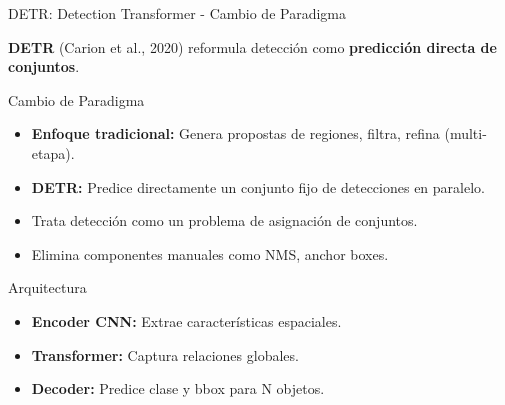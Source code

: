 \documentclass[aspectratio=169, 10pt]{beamer}
\begin{document}
\begin{frame}{DETR: Detection Transformer - Cambio de Paradigma}

	\textbf{DETR} (Carion et al., 2020) reformula detecci\'on como \textbf{predicci\'on directa de conjuntos}.

	\vspace{0.3cm}

	\begin{block}{Cambio de Paradigma}
		\begin{itemize}
			\item \textbf{Enfoque tradicional:} Genera propostas de regiones, filtra, refina (multi-etapa).
			\item \textbf{DETR:} Predice directamente un conjunto fijo de detecciones en paralelo.
			\item Trata detecci\'on como un problema de asignaci\'on de conjuntos.
			\item Elimina componentes manuales como NMS, anchor boxes.
		\end{itemize}
	\end{block}

	\vspace{0.3cm}

	\begin{block}{Arquitectura}
		\begin{itemize}
			\item \textbf{Encoder CNN:} Extrae caracter\'isticas espaciales.
			\item \textbf{Transformer:} Captura relaciones globales.
			\item \textbf{Decoder:} Predice clase y bbox para N objetos.
		\end{itemize}
	\end{block}

\end{frame}
\end{document}
